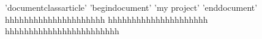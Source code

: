 ’documentclass{article}’
’begin{document}’
’my project’
’end{document}’
hhhhhhhhhhhhhhhhhhhhh
hhhhhhhhhhhhhhhhhhhhh
hhhhhhhhhhhhhhhhhhhhhhhh
